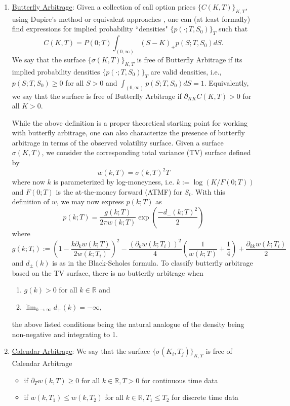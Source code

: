 \documentclass[11pt,letterpaper]{article}
\begin{document}
\begin{enumerate}
\item  \label{item:butterfly}\underline{Butterfly Arbitrage}: Given a collection of call option prices $\{C(K,T)\}_{K,T}$, using Dupire's method or equivalent approaches \cite{dupire1994pricing}, \cite{andersen2000jump} one can (at least formally) find expressions for implied probability ``densities" $\{ p(\cdot;T,S_0) \}_{T}$ such that 
\[
C(K,T) = P(0;T) \int_{(0,\infty)} (S - K)_+ p(S;T,S_0) dS.
\]
We say that the surface $\{ \sigma(K,T) \}_{K,T}$ is free of Butterfly Arbitrage if its implied probability densities $\{p(\cdot ; T,S_0)\}_{T}$ are valid densities, i.e., $p(S;T,S_0) \geq 0$ for all $S > 0$ and $\int_{(0,\infty)} p(S;T,S_0) dS = 1$. Equivalently, we say that the surface is free of Butterfly Arbitrage if $\partial_{KK}C(K,T) > 0$ for all $K > 0$. 

While the above definition is a proper theoretical starting point for working with butterfly arbitrage, one can also characterize the presence of butterfly arbitrage in terms of the observed volatility surface. Given a surface $\sigma(K,T)$, we consider the corresponding total variance (TV) surface defined by 
\[
w(k,T) = \sigma(k,T)^2 T
\]
where now $k$ is parameterized by log-moneyness, i.e. $k := \log(K/F(0;T))$ and $F(0;T)$ is the at-the-money forward (ATMF) for $S_t$. With this definition of $w$, we may now express $p(k;T)$ as
\[
p(k;T) =  \frac{g(k;T)}{ 2 \pi w(k;T) } \exp{ \left( \frac{-d_{-}(k;T)^2 }{2} \right)  }
\]
where 
\begin{equation}
g(k;T_i) := \left(1 - \frac{k \partial_k w(k;T)}{2 w(k;T_i)} \right)^2 - \frac{ \left( \partial_kw(k;T_i)\right)^2}{4}\left( \frac{1}{w(k;T)} + \frac{1}{4}  \right) + \frac{\partial_{kk}w(k;T_i)}{2} 
\label{eqn:gfun}
\end{equation}
and $d_{\pm}(k)$ is as in the Black-Scholes formula. To classify butterfly arbitrage based on the TV surface, there is no butterfly arbitrage when
\begin{enumerate}
\item 
 $g(k) > 0$ for all $k \in \mathbb{R}$ and 
\item  
 $\lim_{k \to \infty}d_+(k) = -\infty$,
\end{enumerate}
the above listed conditions being the natural analogue of the density being non-negative and integrating to 1. 


\item \label{item:calendar} \underline{Calendar Arbitrage}: We say that the surface $\{ \sigma(K_i,T_j) \}_{K,T}$ is free of Calendar Arbitrage 
\begin{itemize}
\item if $\partial_T w(k,T) \geq 0 $ for all $k \in \mathbb{R}, T > 0$ for continuous time data
\item if $w(k,T_1) \leq w(k,T_2)$ for all $k \in \mathbb{R},  T_1 \leq T_2$ for discrete time data 
\end{itemize}
\end{enumerate}
\end{document}

